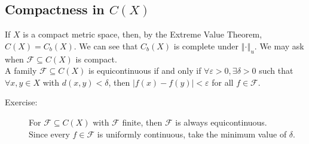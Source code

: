\documentclass[10pt]{extarticle}
\newcommand{\norm}[1]{\left\Vert #1 \right\Vert}
\begin{document}
  \subsection{Compactness in $C(X)$}%
  If $X$ is a compact metric space, then, by the Extreme Value Theorem, $C(X) = C_b(X)$. We can see that $C_b(X)$ is complete under $\norm{\cdot}_u$. We may ask when $\mathcal{F}\subseteq C(X)$ is compact.\\

  A family $\mathcal{F}\subseteq C(X)$ is equicontinuous if and only if $\forall \varepsilon > 0, \exists \delta > 0$ such that $\forall x,y\in X$ with $d(x,y) < \delta$, then $|f(x)-f(y)| < \varepsilon$ for all $f\in \mathcal{F}$.
  \begin{description}
    \item[Exercise:] For $\mathcal{F}\subseteq C(X)$ with $\mathcal{F}$ finite, then $\mathcal{F}$ is always equicontinuous.\\

      Since every $f\in \mathcal{F}$ is uniformly continuous, take the minimum value of $\delta$.
  \end{description}
\end{document}
